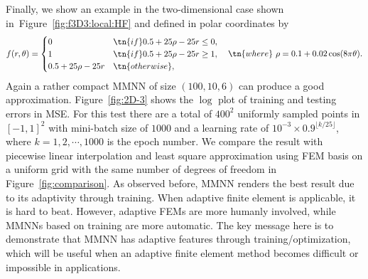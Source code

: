 \documentclass[review,hidelinks,onefignum,onetabnum]{siamart250211}
\begin{document}
Finally, we show an example in the two-dimensional  case shown in~Figure~\ref{fig:f3D3:local:HF} and defined in polar coordinates by
\begin{equation*}
    f(r,\theta)=\begin{cases}
        0 & \tn{if  } 0.5+25\rho-25r\le 0,\\
        1 & \tn{if  } 0.5+25\rho-25r\ge 1,\\
        0.5+25\rho-25r & \tn{otherwise},\\
    \end{cases}
    \quad \tn{where}\ \rho=0.1+0.02\cos(8\pi  \theta).
\end{equation*}
Again a rather compact MMNN of size $(100,10,6)$ can produce a good approximation. 
Figure~\ref{fig:2D-3} shows the $\log$ plot of training and testing errors in MSE. For this test there are a total of $400^2$ uniformly sampled points in $[-1,1]^2$ with mini-batch size of $1000$ and a learning rate of $10^{-3}\times 0.9^{\lfloor k/25 \rfloor}$, where $k=1,2,\cdots,1000$ is the epoch number. We compare the result with piecewise linear interpolation and least square approximation using FEM basis on a uniform grid with the same number of degrees of freedom in Figure~\ref{fig:comparison}. As observed before, MMNN renders the best result due to its adaptivity through training.
    When adaptive finite element is applicable, it is hard to beat. However, adaptive FEMs are more humanly involved, while MMNNs based on training are more automatic. The key message here is to demonstrate that MMNN has adaptive features through training/optimization, which will be useful when an adaptive finite element method becomes difficult or impossible in applications. 
\end{document}
